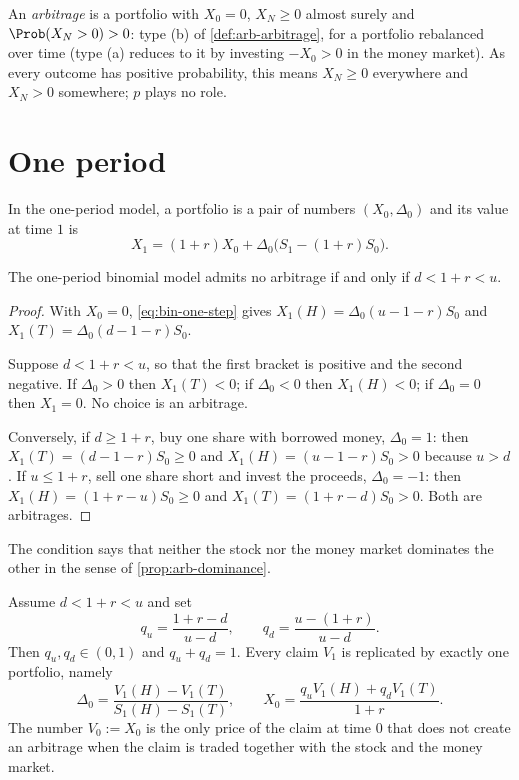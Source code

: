 An \emph{arbitrage} is a portfolio with $X_0=0$, $X_N\ge0$ almost surely and
$\Prob(X_N>0)>0$: type (b) of \cref{def:arb-arbitrage}, for a portfolio rebalanced over
time (type (a) reduces to it by investing $-X_0>0$ in the money market). As every outcome
has positive probability, this means $X_N\ge0$ everywhere and $X_N>0$ somewhere; $p$ plays
no role.

\section{One period}\label{sec:bin-one-period}

In the one-period model, a portfolio is a pair of numbers $(X_0,\Delta_0)$ and its value
at time $1$ is
\begin{equation}\label{eq:bin-one-step}
  X_1=(1+r)X_0+\Delta_0\big(S_1-(1+r)S_0\big).
\end{equation}

\begin{proposition}\label{prop:bin-no-arbitrage}
The one-period binomial model admits no arbitrage if and only if $d<1+r<u$.
\end{proposition}

\begin{proof}
With $X_0=0$, \eqref{eq:bin-one-step} gives $X_1(H)=\Delta_0(u-1-r)S_0$ and
$X_1(T)=\Delta_0(d-1-r)S_0$.

Suppose $d<1+r<u$, so that the first bracket is positive and the second negative. If
$\Delta_0>0$ then $X_1(T)<0$; if $\Delta_0<0$ then $X_1(H)<0$; if $\Delta_0=0$ then
$X_1=0$. No choice is an arbitrage.

Conversely, if $d\ge1+r$, buy one share with borrowed money, $\Delta_0=1$: then
$X_1(T)=(d-1-r)S_0\ge0$ and $X_1(H)=(u-1-r)S_0>0$ because $u>d$. If $u\le1+r$, sell one
share short and invest the proceeds, $\Delta_0=-1$: then $X_1(H)=(1+r-u)S_0\ge0$ and
$X_1(T)=(1+r-d)S_0>0$. Both are arbitrages.
\end{proof}

The condition says that neither the stock nor the money market dominates the other in the
sense of \cref{prop:arb-dominance}.

\begin{theorem}\label{thm:bin-one-period}
Assume $d<1+r<u$ and set
\begin{equation}\label{eq:bin-q}
  q_u=\frac{1+r-d}{u-d},\qquad q_d=\frac{u-(1+r)}{u-d}.
\end{equation}
Then $q_u,q_d\in(0,1)$ and $q_u+q_d=1$. Every claim $V_1$ is replicated by exactly one
portfolio, namely
\begin{equation}\label{eq:bin-replication}
  \Delta_0=\frac{V_1(H)-V_1(T)}{S_1(H)-S_1(T)},\qquad
  X_0=\frac{q_uV_1(H)+q_dV_1(T)}{1+r}.
\end{equation}
The number $V_0:=X_0$ is the only price of the claim at time $0$ that does not create an
arbitrage when the claim is traded together with the stock and the money market.
\end{theorem}

